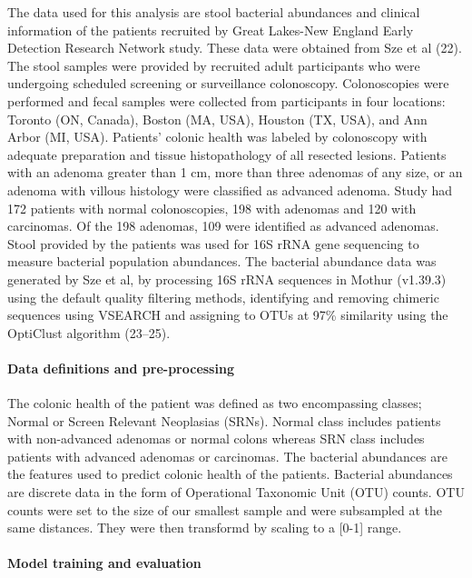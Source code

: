 \documentclass[11pt,]{article}
\let\oldparagraph\paragraph
\renewcommand{\paragraph}[1]{\oldparagraph{#1}\mbox{}}
\begin{document}
The data used for this analysis are stool bacterial abundances and
clinical information of the patients recruited by Great Lakes-New
England Early Detection Research Network study. These data were obtained
from Sze et al (22). The stool samples were provided by recruited adult
participants who were undergoing scheduled screening or surveillance
colonoscopy. Colonoscopies were performed and fecal samples were
collected from participants in four locations: Toronto (ON, Canada),
Boston (MA, USA), Houston (TX, USA), and Ann Arbor (MI, USA). Patients'
colonic health was labeled by colonoscopy with adequate preparation and
tissue histopathology of all resected lesions. Patients with an adenoma
greater than 1 cm, more than three adenomas of any size, or an adenoma
with villous histology were classified as advanced adenoma. Study had
172 patients with normal colonoscopies, 198 with adenomas and 120 with
carcinomas. Of the 198 adenomas, 109 were identified as advanced
adenomas. Stool provided by the patients was used for 16S rRNA gene
sequencing to measure bacterial population abundances. The bacterial
abundance data was generated by Sze et al, by processing 16S rRNA
sequences in Mothur (v1.39.3) using the default quality filtering
methods, identifying and removing chimeric sequences using VSEARCH and
assigning to OTUs at 97\% similarity using the OptiClust algorithm
(23--25).

\paragraph{Data definitions and
pre-processing}\label{data-definitions-and-pre-processing}

The colonic health of the patient was defined as two encompassing
classes; Normal or Screen Relevant Neoplasias (SRNs). Normal class
includes patients with non-advanced adenomas or normal colons whereas
SRN class includes patients with advanced adenomas or carcinomas. The
bacterial abundances are the features used to predict colonic health of
the patients. Bacterial abundances are discrete data in the form of
Operational Taxonomic Unit (OTU) counts. OTU counts were set to the size
of our smallest sample and were subsampled at the same distances. They
were then transformd by scaling to a {[}0-1{]} range.

\paragraph{Model training and
evaluation}\label{model-training-and-evaluation}
\end{document}
